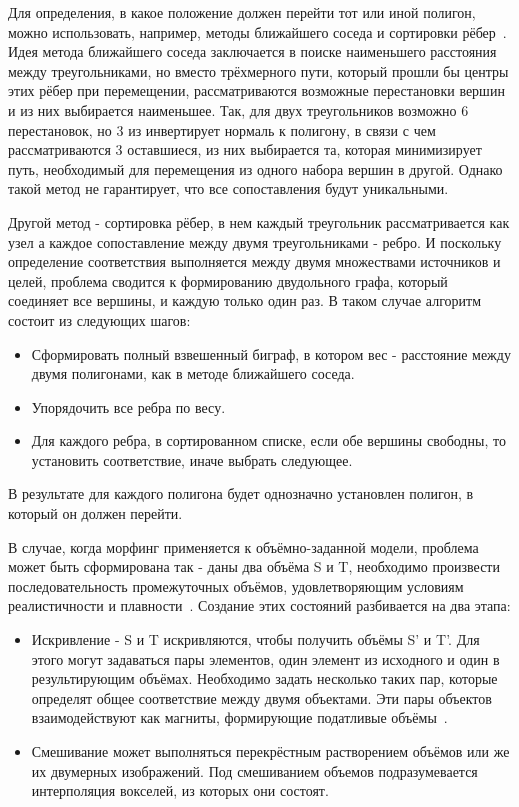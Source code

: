 \par Для определения, в какое положение должен перейти тот или иной полигон, можно использовать, например, методы ближайшего соседа и сортировки рёбер~\cite{morphing}. Идея метода ближайшего соседа заключается в поиске наименьшего расстояния между треугольниками, но вместо трёхмерного пути, который прошли бы центры этих рёбер при перемещении, рассматриваются возможные перестановки вершин и из них выбирается наименьшее. Так, для двух треугольников возможно 6 перестановок, но 3 из инвертирует нормаль к полигону, в связи с чем рассматриваются 3 оставшиеся, из них выбирается та, которая минимизирует путь, необходимый для перемещения из одного набора вершин в другой. Однако такой метод не гарантирует, что все сопоставления будут уникальными.
\par Другой метод - сортировка рёбер, в нем каждый треугольник рассматривается как узел а каждое сопоставление между двумя треугольниками - ребро. И поскольку определение соответствия выполняется между двумя множествами источников и целей, проблема сводится к формированию двудольного графа, который соединяет все вершины, и каждую только один раз. В таком случае алгоритм состоит из следующих шагов:
\begin{itemize}
	\item Сформировать полный взвешенный биграф, в котором вес - расстояние между двумя полигонами, как в методе ближайшего соседа.
	\item Упорядочить все ребра по весу.
	\item Для каждого ребра, в сортированном списке, если обе вершины свободны, то установить соответствие, иначе выбрать следующее.
\end{itemize}
В результате для каждого полигона будет однозначно установлен полигон, в который он должен перейти.

В случае, когда морфинг применяется к объёмно-заданной модели, проблема может быть сформирована так - даны два объёма S и T, необходимо произвести последовательность промежуточных объёмов, удовлетворяющим условиям реалистичности и плавности~\cite{volume_morph}. Создание этих состояний разбивается на два этапа:
\begin{itemize}
	\item Искривление - S и T искривляются, чтобы получить объёмы S' и T'. Для этого могут задаваться пары элементов, один элемент из исходного и один в результирующим объёмах. Необходимо задать несколько таких пар, которые определят общее соответствие между двумя объектами. Эти пары объектов взаимодействуют как магниты, формирующие податливые объёмы~\cite{volume_morph}.
	\item Смешивание может выполняться перекрёстным растворением объёмов или же их двумерных изображений. Под смешиванием объемов подразумевается интерполяция вокселей, из которых они состоят.
\end{itemize}
